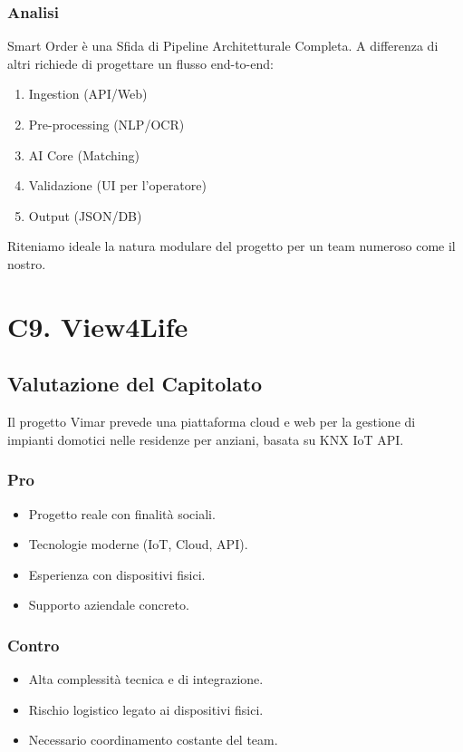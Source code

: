 \documentclass[a4paper, 11pt, oneside]{scrartcl} %
\begin{document}
\subsubsection*{Analisi}
Smart Order è una Sfida di Pipeline Architetturale Completa. A differenza di altri richiede di progettare un flusso end-to-end:
\begin{enumerate}
    \item Ingestion (API/Web)
    \item Pre-processing (NLP/OCR)
    \item AI Core (Matching)
    \item Validazione (UI per l'operatore)
    \item Output (JSON/DB)
\end{enumerate}
Riteniamo ideale la natura modulare del progetto per un team numeroso come il nostro.
\section{C9. View4Life}
\subsection*{Valutazione del Capitolato}
Il progetto Vimar prevede una piattaforma cloud e web per la gestione di impianti domotici nelle residenze per anziani, basata su KNX IoT API.

\subsubsection*{Pro}
\begin{itemize}
    \item Progetto reale con finalità sociali.
    \item Tecnologie moderne (IoT, Cloud, API).
    \item Esperienza con dispositivi fisici.
    \item Supporto aziendale concreto.
\end{itemize}

\subsubsection*{Contro}
\begin{itemize}
    \item Alta complessità tecnica e di integrazione.
    \item Rischio logistico legato ai dispositivi fisici.
    \item Necessario coordinamento costante del team.
\end{itemize}
\end{document}
